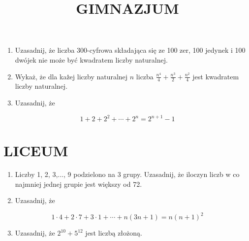 \documentclass[10pt]{article}
\title{GIMNAZJUM }
\author{}
\date{}
\begin{document}
\maketitle
\begin{enumerate}
  \item Uzasadnij, że liczba 300-cyfrowa składająca się ze 100 zer, 100 jedynek i 100 dwójek nie może być kwadratem liczby naturalnej.
  \item Wykaż, że dla każ̇̇ej liczby naturalnej \(n\) liczba \(\frac{n^{4}}{4}+\frac{n^{3}}{2}+\frac{n^{2}}{4}\) jest kwadratem liczby naturalnej.
  \item Uzasadnij, że
\end{enumerate}

\[
1+2+2^{2}+\cdots+2^{n}=2^{n+1}-1
\]

\section*{LICEUM}
\begin{enumerate}
  \item Liczby 1, 2, 3,..., 9 podzielono na 3 grupy. Uzasadnij, że iloczyn liczb w co najmniej jednej grupie jest większy od 72.
  \item Uzasadnij, że
\end{enumerate}

\[
1 \cdot 4+2 \cdot 7+3 \cdot 1+\cdots+n(3 n+1)=n(n+1)^{2}
\]

\begin{enumerate}
  \setcounter{enumi}{2}
  \item Uzasadnij, że \(2^{10}+5^{12}\) jest liczbą złożoną.
\end{enumerate}
\end{document}
